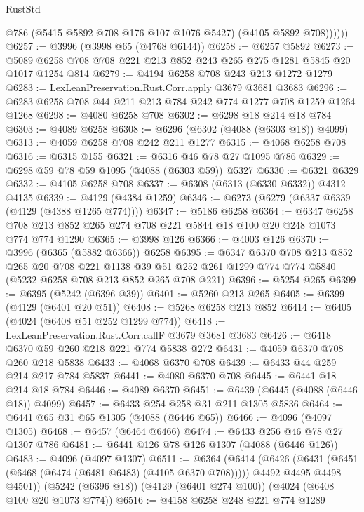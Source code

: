 \begin{lexlean}{RustStd}
\begin{coremodule}
              @786
              (@5415 @5892 @708 @176 @107 @1076 @5427)
              (@4105 @5892 @708))))))
@6257 := @3996 (@3998 @65 (@4768 @6144))
@6258 := @6257 @5892
@6273 := @5089 @6258 @708 @708 @221 @213 @852 @243 @265 @275 @1281 @5845 @20 @1017 @1254 @814
@6279 := @4194 @6258 @708 @243 @213 @1272 @1279
@6283 := LexLeanPreservation.Rust.Corr.apply @3679 @3681 @3683
@6296 := @6283 @6258 @708 @44 @211 @213 @784 @242 @774 @1277 @708 @1259 @1264 @1268
@6298 := @4080 @6258 @708
@6302 := @6298 @18 @214 @18 @784
@6303 := @4089 @6258
@6308 := @6296 (@6302 (@4088 (@6303 @18)) @4099)
@6313 := @4059 @6258 @708 @242 @211 @1277
@6315 := @4068 @6258 @708
@6316 := @6315 @155
@6321 := @6316 @46 @78 @27 @1095 @786
@6329 := @6298 @59 @78 @59 @1095 (@4088 (@6303 @59)) @5327
@6330 := @6321 @6329
@6332 := @4105 @6258 @708
@6337 := @6308 (@6313 (@6330 @6332)) @4312 @4135
@6339 := @4129 (@4384 @1259)
@6346 := @6273 (@6279 (@6337 @6339 (@4129 (@4388 @1265 @774))))
@6347 := @5186 @6258
@6364 := @6347
    @6258
    @708
    @213
    @852
    @265
    @274
    @708
    @221
    @5844
    @18
    @100
    @20
    @248
    @1073
    @774
    @774
    @1290
@6365 := @3998 @126
@6366 := @4003 @126
@6370 := @3996 (@6365 (@5882 @6366)) @6258
@6395 := @6347
    @6370
    @708
    @213
    @852
    @265
    @20
    @708
    @221
    @1138
    @39
    @51
    @252
    @261
    @1299
    @774
    @774
    @5840
    (@5232 @6258 @708 @213 @852 @265 @708 @221)
@6396 := @5254 @265
@6399 := @6395 (@5242 (@6396 @39))
@6401 := @5260 @213 @265
@6405 := @6399 (@4129 (@6401 @20 @51))
@6408 := @5268 @6258 @213 @852
@6414 := @6405 (@4024 (@6408 @51 @252 @1299 @774))
@6418 := LexLeanPreservation.Rust.Corr.callF @3679 @3681 @3683
@6426 := @6418 @6370 @59 @260 @218 @221 @774 @5838 @272
@6431 := @4059 @6370 @708 @260 @218 @5838
@6433 := @4068 @6370 @708
@6439 := @6433 @44 @259 @214 @217 @784 @5837
@6441 := @4080 @6370 @708
@6445 := @6441 @18 @214 @18 @784
@6446 := @4089 @6370
@6451 := @6439 (@6445 (@4088 (@6446 @18)) @4099)
@6457 := @6433 @254 @258 @31 @211 @1305 @5836
@6464 := @6441 @65 @31 @65 @1305 (@4088 (@6446 @65))
@6466 := @4096 (@4097 @1305)
@6468 := @6457 (@6464 @6466)
@6474 := @6433 @256 @46 @78 @27 @1307 @786
@6481 := @6441 @126 @78 @126 @1307 (@4088 (@6446 @126))
@6483 := @4096 (@4097 @1307)
@6511 := @6364
    (@6414
      (@6426
        (@6431 (@6451 (@6468 (@6474 (@6481 @6483) (@4105 @6370 @708)))))
        @4492
        @4495
        @4498
        @4501))
    (@5242 (@6396 @18))
    (@4129 (@6401 @274 @100))
    (@4024 (@6408 @100 @20 @1073 @774))
@6516 := @4158 @6258 @248 @221 @774 @1289

\end{coremodule}
\end{lexlean}
